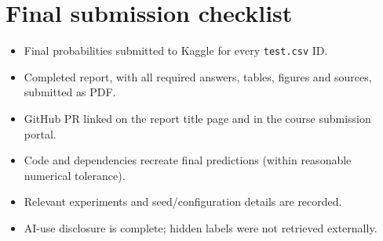 \documentclass[11pt,letterpaper]{article}
\begin{document}
\section*{Final submission checklist}
\begin{itemize}[label=$\square$]
\item Final probabilities submitted to Kaggle for every \texttt{test.csv} ID.
\item Completed report, with all required answers, tables, figures and sources, submitted as PDF.
\item GitHub PR linked on the report title page and in the course submission portal.
\item Code and dependencies recreate final predictions (within reasonable numerical tolerance).
\item Relevant experiments and seed/configuration details are recorded.
\item AI-use disclosure is complete; hidden labels were not retrieved externally.
\end{itemize}
\end{document}
